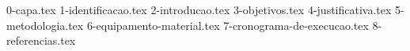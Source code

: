 \documentclass[12pt,nodisplayskipstretch]{article}
\begin{document}
{0-capa.tex}
{1-identificacao.tex}
{2-introducao.tex}
{3-objetivos.tex}
{4-justificativa.tex}
{5-metodologia.tex}
{6-equipamento-material.tex}
{7-cronograma-de-execucao.tex}
{8-referencias.tex}
\end{document}
